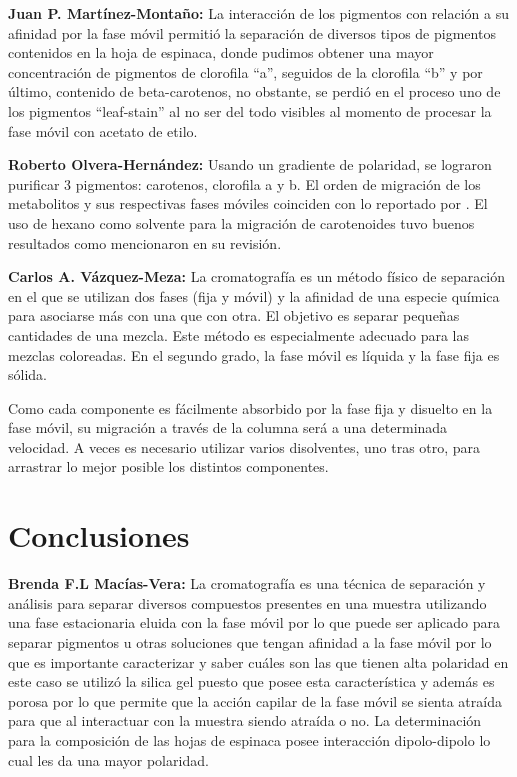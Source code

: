 \documentclass{ITESO-Project}
\begin{document}
{\color{darkgray}\bfseries Juan P. Martínez-Montaño:}\hspace{1em}
La interacción de los pigmentos con relación a su afinidad por la fase móvil permitió la separación de diversos tipos de pigmentos contenidos en la hoja de espinaca, donde pudimos obtener una mayor concentración de pigmentos de clorofila “a”, seguidos de la clorofila “b” y por último, contenido de beta-carotenos, no obstante, se perdió en el proceso uno de los pigmentos “leaf-stain” al no ser del todo visibles al momento de procesar la fase móvil con acetato de etilo.

{\color{darkgray}\bfseries Roberto Olvera-Hernández:}\hspace{1em}
Usando un gradiente de polaridad, se lograron purificar 3 pigmentos: carotenos, clorofila a y b. El orden de migración de los metabolitos y sus respectivas fases móviles coinciden con lo reportado por \textcite{Khalyfa1992}. El uso de hexano como solvente para la migración de carotenoides tuvo buenos resultados como mencionaron \textcite{Mussagy2018} en su revisión.

{\color{darkgray}\bfseries Carlos A. Vázquez-Meza:}\hspace{1em}
La cromatografía es un método físico de separación en el que se utilizan dos fases (fija y móvil) y la afinidad de una especie química para asociarse más con una que con otra. El objetivo es separar pequeñas cantidades de una mezcla. Este método es especialmente adecuado para las mezclas coloreadas. En el segundo grado, la fase móvil es líquida y la fase fija es sólida.

Como cada componente es fácilmente absorbido por la fase fija y disuelto en la fase móvil, su migración a través de la columna será a una determinada velocidad. A veces es necesario utilizar varios disolventes, uno tras otro, para arrastrar lo mejor posible los distintos componentes.


\section{Conclusiones}

{\color{darkgray}\bfseries Brenda F.L Macías-Vera:}\hspace{1em}
La cromatografía es una técnica de separación y análisis para separar diversos compuestos presentes en una muestra utilizando una fase estacionaria eluida con la fase móvil por lo que puede ser aplicado para separar pigmentos u otras soluciones que tengan afinidad a la fase móvil por lo que es importante caracterizar y saber cuáles son las que tienen alta polaridad en este caso se utilizó la silica gel puesto que posee esta característica y además es porosa por lo que permite que la acción capilar de la fase móvil se sienta atraída para que al interactuar con la muestra siendo atraída o no. La determinación para la composición de las hojas de espinaca posee interacción dipolo-dipolo lo cual les da una mayor polaridad.
\end{document}
